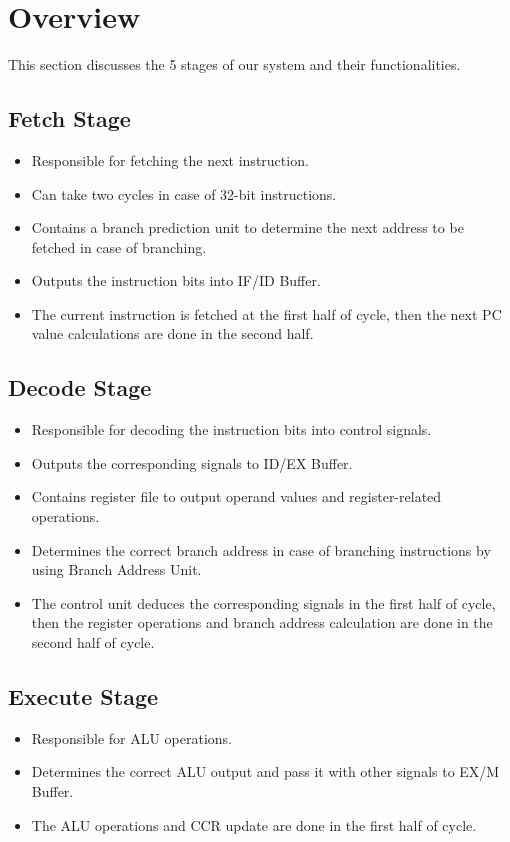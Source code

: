 \documentclass[12pt]{report}
\begin{document}
\section{Overview}
This section discusses the 5 stages of our system and their functionalities.

\subsection{Fetch Stage}
\begin{itemize}
    \item Responsible for fetching the next instruction.
    \item Can take two cycles in case of 32-bit instructions.
    \item Contains a branch prediction unit to determine the next address to be fetched in case of branching.
    \item Outputs the instruction bits into IF/ID Buffer.
    \item The current instruction is fetched at the first half of cycle, then the next PC value calculations are done in the second half.
\end{itemize}

\subsection{Decode Stage}
\begin{itemize}
    \item Responsible for decoding the instruction bits into control signals.
    \item Outputs the corresponding signals to ID/EX Buffer.
    \item Contains register file to output operand values and register-related operations.
    \item Determines the correct branch address in case of branching instructions by using Branch Address Unit.
    \item The control unit deduces the corresponding signals in the first half of cycle, then the register operations and branch address calculation are done in the second half of cycle.
\end{itemize}

\subsection{Execute Stage}
\begin{itemize}
    \item Responsible for ALU operations.
    \item Determines the correct ALU output and pass it with other signals to EX/M Buffer.
    \item The ALU operations and CCR update are done in the first half of cycle.
\end{itemize}
\end{document}
